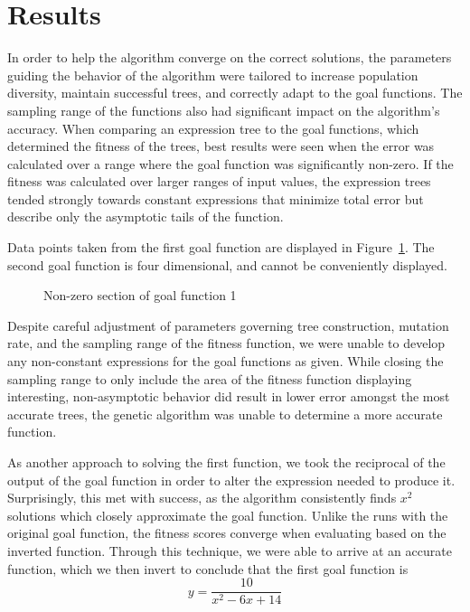 
\section{Results}
\label{sec:results}

In order to help the algorithm converge on the correct solutions, the parameters guiding the behavior of the algorithm were tailored to increase population diversity, maintain successful trees, and correctly adapt to the goal functions.  The sampling range of the functions also had significant impact on the algorithm's accuracy.  When comparing an expression tree to the goal functions, which determined the fitness of the trees, best results were seen when the error was calculated over a range where the goal function was significantly non-zero.  If the fitness was calculated over larger ranges of input values, the expression trees tended strongly towards constant expressions that minimize total error but describe only the asymptotic tails of the function.  

Data points taken from the first goal function are displayed in Figure~\ref{tab:fcn1}.  The second goal function is four dimensional, and cannot be conveniently displayed.

\begin{figure}
\centering
\caption{Non-zero section of goal function 1}
\label{tab:fcn1}
\end{figure}

Despite careful adjustment of parameters governing tree construction, mutation rate, and the sampling range of the fitness function, we were unable to develop any non-constant expressions for the goal functions as given.  While closing the sampling range to only include the area of the fitness function displaying interesting, non-asymptotic behavior did result in lower error amongst the most accurate trees, the genetic algorithm was unable to determine a more accurate function.  

As another approach to solving the first function, we took the reciprocal of the output of the goal function in order to alter the expression needed to produce it.  Surprisingly, this met with success, as the algorithm consistently finds $x^2$ solutions which closely approximate the goal function.  Unlike the runs with the original goal function, the fitness scores converge when evaluating based on the inverted function.  Through this technique, we were able to arrive at an accurate function, which we then invert to conclude that the first goal function is 
	$$ y = \frac{10}{x^2- 6x + 14} $$

